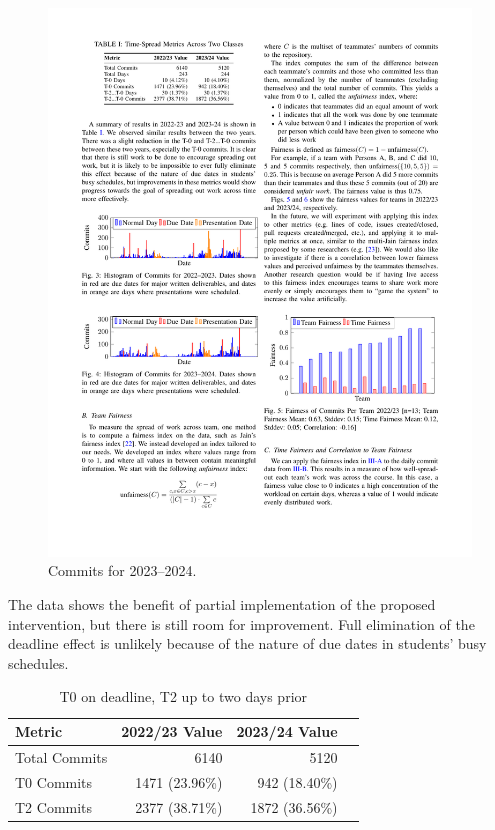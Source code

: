 \documentclass[poster, a1, plainboxedsections]{sciposter}
\begin{document}
\begin{multicols}{2}
\begin{figure}[h!]
\centering
\includegraphics[width=0.9\linewidth]{../figures/HistCommits2023-24.pdf}
\caption{Commits for 2023--2024.}\label{Fig_23_24Timeline}
\end{figure}

The data shows the benefit of partial implementation of the proposed
intervention, but there is still room for improvement. Full elimination of
the deadline effect is unlikely because of the nature of due dates in students' busy
schedules.

\begin{table}
\caption{T0 on deadline, T2 up to two days prior}
\centering
\begin{tabular}{@{}lrrr@{}}
\toprule
\textbf{Metric} & \textbf{2022/23 Value} & \textbf{2023/24 Value} \\ 
\midrule
Total Commits & 6140 & 5120 \\
T0 Commits & 1471 (23.96\%) & 942 (18.40\%) \\
T2 Commits & 2377 (38.71\%) & 1872 (36.56\%) \\ 
\bottomrule
\end{tabular}
\end{table}


\end{multicols}
\end{document}
